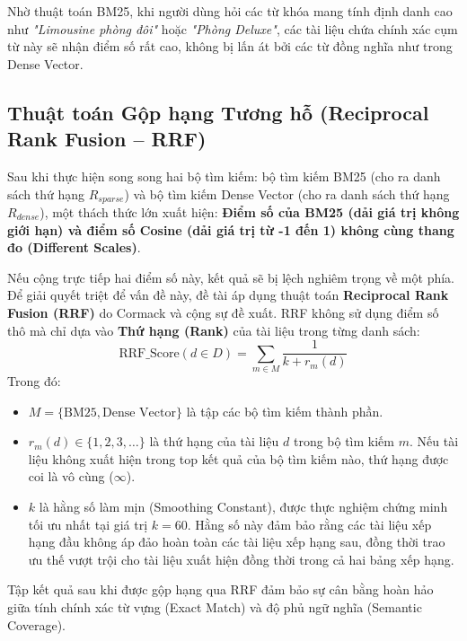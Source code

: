Nhờ thuật toán BM25, khi người dùng hỏi các từ khóa mang tính định danh cao như \textit{"Limousine phòng đôi"} hoặc \textit{"Phòng Deluxe"}, các tài liệu chứa chính xác cụm từ này sẽ nhận điểm số rất cao, không bị lấn át bởi các từ đồng nghĩa như trong Dense Vector.

\subsection{Thuật toán Gộp hạng Tương hỗ (Reciprocal Rank Fusion -- RRF)}
Sau khi thực hiện song song hai bộ tìm kiếm: bộ tìm kiếm BM25 (cho ra danh sách thứ hạng $R_{sparse}$) và bộ tìm kiếm Dense Vector (cho ra danh sách thứ hạng $R_{dense}$), một thách thức lớn xuất hiện: \textbf{Điểm số của BM25 (dải giá trị không giới hạn) và điểm số Cosine (dải giá trị từ -1 đến 1) không cùng thang đo (Different Scales)}.

Nếu cộng trực tiếp hai điểm số này, kết quả sẽ bị lệch nghiêm trọng về một phía. Để giải quyết triệt để vấn đề này, đề tài áp dụng thuật toán \textbf{Reciprocal Rank Fusion (RRF)} do Cormack và cộng sự đề xuất. RRF không sử dụng điểm số thô mà chỉ dựa vào \textbf{Thứ hạng (Rank)} của tài liệu trong từng danh sách:
\begin{equation}
    \text{RRF\_Score}(d \in D) = \sum_{m \in M} \frac{1}{k + r_m(d)}
\end{equation}
Trong đó:
\begin{itemize}
    \item $M = \{\text{BM25}, \text{Dense Vector}\}$ là tập các bộ tìm kiếm thành phần.
    \item $r_m(d) \in \{1, 2, 3, \dots\}$ là thứ hạng của tài liệu $d$ trong bộ tìm kiếm $m$. Nếu tài liệu không xuất hiện trong top kết quả của bộ tìm kiếm nào, thứ hạng được coi là vô cùng ($\infty$).
    \item $k$ là hằng số làm mịn (Smoothing Constant), được thực nghiệm chứng minh tối ưu nhất tại giá trị $k = 60$. Hằng số này đảm bảo rằng các tài liệu xếp hạng đầu không áp đảo hoàn toàn các tài liệu xếp hạng sau, đồng thời trao ưu thế vượt trội cho tài liệu xuất hiện đồng thời trong cả hai bảng xếp hạng.
\end{itemize}
Tập kết quả sau khi được gộp hạng qua RRF đảm bảo sự cân bằng hoàn hảo giữa tính chính xác từ vựng (Exact Match) và độ phủ ngữ nghĩa (Semantic Coverage).
